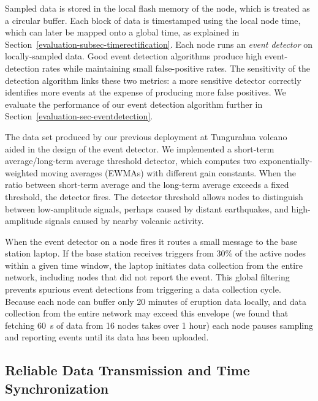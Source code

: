 Sampled data is stored in the local flash memory of the node, which is
treated as a circular buffer. Each block of data is timestamped using the
local node time, which can later be mapped onto a global time, as explained
in Section~\ref{evaluation-subsec-timerectification}. Each node runs an
\textit{event detector} on locally-sampled data. Good event detection
algorithms produce high event-detection rates while maintaining small
false-positive rates. The sensitivity of the detection algorithm links these
two metrics: a more sensitive detector correctly identifies more events at
the expense of producing more false positives. We evaluate the performance of
our event detection algorithm further in
Section~\ref{evaluation-sec-eventdetection}.

The data set produced by our previous deployment at Tungurahua
volcano~\cite{volcano-ewsn05} aided in the design of the event detector. We
implemented a short-term average/long-term average threshold detector, which
computes two exponentially-weighted moving averages (EWMAs) with different
gain constants. When the ratio between short-term average and the long-term
average exceeds a fixed threshold, the detector fires. The detector threshold
allows nodes to distinguish between low-amplitude signals, perhaps caused by
distant earthquakes, and high-amplitude signals caused by nearby volcanic
activity.

When the event detector on a node fires it routes a small message to the base
station laptop. If the base station receives triggers from 30\% of the active
nodes within a given time window, the laptop initiates data collection from
the entire network, including nodes that did not report the event. This
global filtering prevents spurious event detections from triggering a data
collection cycle. Because each node can buffer only 20 minutes of eruption
data locally, and data collection from the entire network may exceed this
envelope (we found that fetching 60~s of data from 16 nodes takes over 1
hour) each node pauses sampling and reporting events until its data has been
uploaded.

\subsection{Reliable Data Transmission and Time Synchronization}
\label{evaluation-subsec-fetch}

